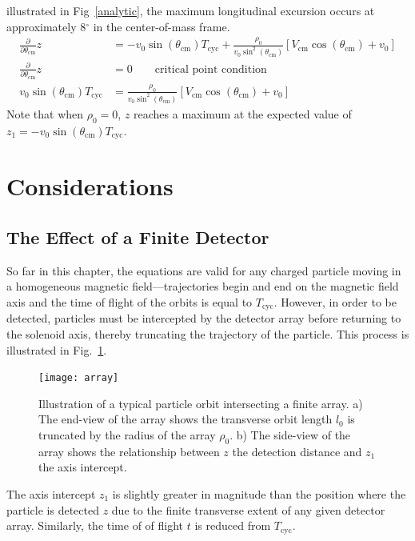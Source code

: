 illustrated in Fig~\ref{analytic}, the maximum longitudinal excursion occurs at approximately 8$^\circ$ %
in the center-of-mass frame.  
\begin{equation}
\begin{split}
\frac{\partial}{\partial \theta_\mathrm{cm}}z&=-v_0\sin(\theta_\mathrm{cm})T_\mathrm{cyc}
+\frac{\rho_0}{v_0\sin^2(\theta_\mathrm{cm})}[V_\mathrm{cm}\cos(\theta_\mathrm{cm})+v_0]\\
\frac{\partial}{\partial \theta_\mathrm{cm}}z&=0\qquad \textrm{critical point condition}\\
v_0\sin(\theta_\mathrm{cm})T_\mathrm{cyc}&=\frac{\rho_0}{v_0\sin^2(\theta_\mathrm{cm})}[V_\mathrm{cm}\cos(\theta_\mathrm{cm})+v_0]
\end{split}
\label{knee_eq}
\end{equation}
Note that when $\rho_0=0$, $z$ reaches a maximum at the expected value of $z_1=-v_0\sin(\theta_\mathrm{cm})T_\mathrm{cyc}$.

\section{Considerations}
\subsection{The Effect of a Finite Detector}
\label{finite}
So far in this chapter, the equations are valid for any charged particle moving in a homogeneous magnetic field---trajectories begin and end on the magnetic field axis and the time of flight of the orbits is equal to $T_\mathrm{cyc}$.
However, in order to be detected, particles must be intercepted by the detector array before returning to the solenoid axis, thereby truncating the trajectory of the particle.  This process is illustrated in Fig.~\ref{orbit_fig}.
\begin{figure}%
\texttt{[image: array]}
\caption[Illustration of a typical particle orbit intersecting a finite array]{Illustration of a typical particle orbit intersecting a finite array. a) The end-view of the array shows the transverse orbit length $l_0$ is truncated by the radius of the array $\rho_0$. b) The side-view of the array shows the relationship between $z$ the detection distance and $z_1$ the axis intercept.}%
\label{orbit_fig}%
\end{figure}
  The axis intercept $z_1$ is slightly greater in magnitude than the position where the particle is detected $z$ due to the finite transverse extent of any given detector array.  Similarly, the time of of flight $t$ is reduced from $T_\mathrm{cyc}$.  
